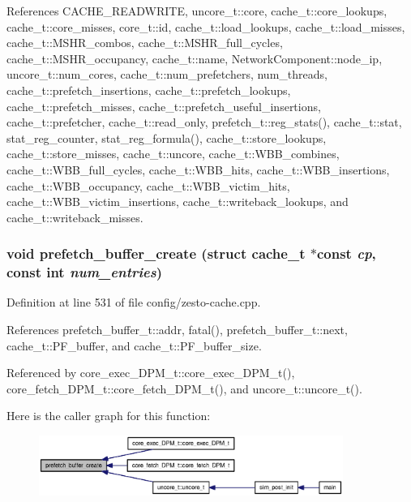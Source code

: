 References CACHE\_\-READWRITE, uncore\_\-t::core, cache\_\-t::core\_\-lookups, cache\_\-t::core\_\-misses, core\_\-t::id, cache\_\-t::load\_\-lookups, cache\_\-t::load\_\-misses, cache\_\-t::MSHR\_\-combos, cache\_\-t::MSHR\_\-full\_\-cycles, cache\_\-t::MSHR\_\-occupancy, cache\_\-t::name, NetworkComponent::node\_\-ip, uncore\_\-t::num\_\-cores, cache\_\-t::num\_\-prefetchers, num\_\-threads, cache\_\-t::prefetch\_\-insertions, cache\_\-t::prefetch\_\-lookups, cache\_\-t::prefetch\_\-misses, cache\_\-t::prefetch\_\-useful\_\-insertions, cache\_\-t::prefetcher, cache\_\-t::read\_\-only, prefetch\_\-t::reg\_\-stats(), cache\_\-t::stat, stat\_\-reg\_\-counter, stat\_\-reg\_\-formula(), cache\_\-t::store\_\-lookups, cache\_\-t::store\_\-misses, cache\_\-t::uncore, cache\_\-t::WBB\_\-combines, cache\_\-t::WBB\_\-full\_\-cycles, cache\_\-t::WBB\_\-hits, cache\_\-t::WBB\_\-insertions, cache\_\-t::WBB\_\-occupancy, cache\_\-t::WBB\_\-victim\_\-hits, cache\_\-t::WBB\_\-victim\_\-insertions, cache\_\-t::writeback\_\-lookups, and cache\_\-t::writeback\_\-misses.
\subsubsection[{prefetch\_\-buffer\_\-create}]{\setlength{\rightskip}{0pt plus 5cm}void prefetch\_\-buffer\_\-create (struct {\bf cache\_\-t} $\ast$const  {\em cp}, \/  const int {\em num\_\-entries})}\label{zesto-cache_8h_16dacff1f1e08b2a7fe82d35f3733f91}




Definition at line 531 of file config/zesto-cache.cpp.

References prefetch\_\-buffer\_\-t::addr, fatal(), prefetch\_\-buffer\_\-t::next, cache\_\-t::PF\_\-buffer, and cache\_\-t::PF\_\-buffer\_\-size.

Referenced by core\_\-exec\_\-DPM\_\-t::core\_\-exec\_\-DPM\_\-t(), core\_\-fetch\_\-DPM\_\-t::core\_\-fetch\_\-DPM\_\-t(), and uncore\_\-t::uncore\_\-t().

Here is the caller graph for this function:\nopagebreak
\begin{figure}[H]
\begin{center}
\leavevmode
\includegraphics[width=281pt]{zesto-cache_8h_16dacff1f1e08b2a7fe82d35f3733f91_icgraph}
\end{center}
\end{figure}
